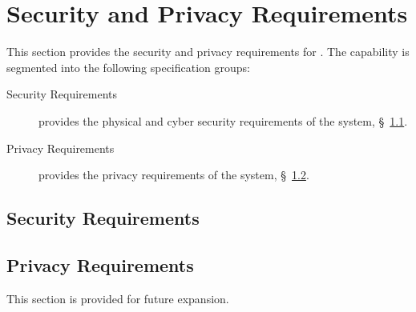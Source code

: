 \KNEADSECTIONNEWPAGE
\section{Security and Privacy Requirements}
\label{lab:sec_SecurityPrivacy}
% 

This section provides the security and privacy requirements for \ThisSys. 
The \ThisSys capability is segmented into the following specification groups:

\begin{description}
	\item [Security Requirements] provides the physical and cyber security requirements of the system, \S~\ref{lab:ssec_Security}.
	\item [Privacy Requirements] provides the privacy requirements of the system, \S~\ref{lab:ssec_Privacy}.
\end{description}

\KNEADSUBSECTIONNEWPAGE
\subsection{Security Requirements}
\label{lab:ssec_Security}




\KNEADSUBSECTIONNEWPAGE
\subsection{Privacy Requirements}
\label{lab:ssec_Privacy}

This section is provided for future expansion.

